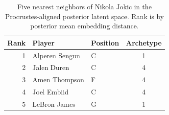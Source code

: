 \begin{table}[htbp]
  \centering\small
  \begin{tabular}{rllc}
    \toprule
    Rank & Player & Position & Archetype \\
    \midrule
    1 & Alperen Sengun & C & 1 \\
    2 & Jalen Duren & C & 4 \\
    3 & Amen Thompson & F & 4 \\
    4 & Joel Embiid & C & 4 \\
    5 & LeBron James & G & 1 \\
    \bottomrule
  \end{tabular}
  \caption{Five nearest neighbors of Nikola Jokic in the Procrustes-aligned posterior latent space. Rank is by posterior mean embedding distance.}
  \label{tab:Nikola_Jokic_neighbors}
\end{table}

